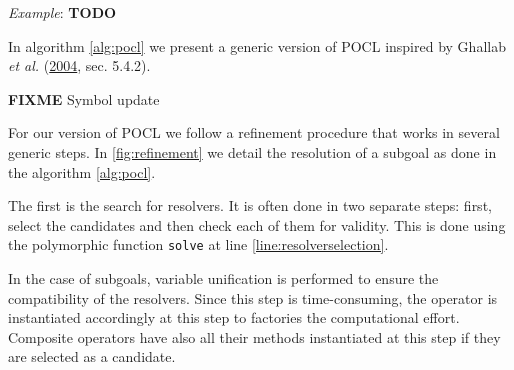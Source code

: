 \documentclass[11pt,a4paper,twoside,openright,titlepage,numbers=noenddot,headinclude,cleardoublepage=empty,openany]{scrreprt}
\theoremstyle{plain}
\theoremstyle{definition}
\theoremstyle{remark}
\newcommand{\passthrough}[1]{#1}
\begin{document}
\emph{Example}: \textbf{TODO}

In algorithm \ref{alg:pocl} we present a generic version of POCL
inspired by Ghallab \emph{et al.}
(\protect\hyperlink{ref-ghallab_automated_2004}{2004}, sec. 5.4.2).

\textbf{FIXME} Symbol update


For our version of POCL we follow a refinement procedure that works in
several generic steps. In \cref{fig:refinement} we detail the resolution
of a subgoal as done in the algorithm \ref{alg:pocl}.

The first is the search for resolvers. It is often done in two separate
steps: first, select the candidates and then check each of them for
validity. This is done using the polymorphic function
\passthrough{\lstinline!solve!} at line \ref{line:resolverselection}.

In the case of subgoals, variable unification is performed to ensure the
compatibility of the resolvers. Since this step is time-consuming, the
operator is instantiated accordingly at this step to factories the
computational effort. Composite operators have also all their methods
instantiated at this step if they are selected as a candidate.
\end{document}

